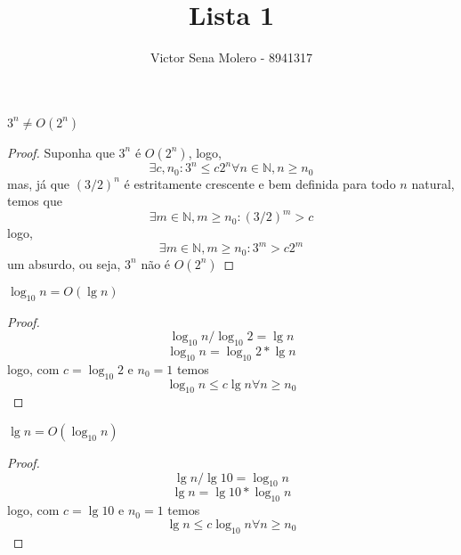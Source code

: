 \documentclass[12pt]{article}
\newcommand{\N}{\mathbb{N}}
\newenvironment{problem}[2][Ex]{\begin{trivlist}
\item[\hskip \labelsep {\bfseries #1}\hskip \labelsep {\bfseries #2.}]}{\end{trivlist}}
\begin{document}
 
 
\title{Lista 1}
\author{Victor Sena Molero - 8941317}
\maketitle
 
\begin{problem}{1.a}
$3^n \neq O(2^n)$
\end{problem}
 
\begin{proof}
Suponha que $3^n$ é $O(2^n)$, logo, \\
$$ \exists c, n_0 : 3^n \leq c2^n \forall n \in \N, n \geq n_0 $$
mas, já que $(3/2)^n$ é estritamente crescente e bem definida para todo $n$ natural, temos que
$$ \exists m \in \N, m \geq n_0 : (3/2)^m > c $$
logo,
$$ \exists m \in \N, m \geq n_0 : 3^m > c2^m $$
um absurdo, ou seja,
$3^n$ não é $O(2^n)$
\end{proof}

\begin{problem}{1.b}
$\log_{10} n = O(\lg n)$
\end{problem}

\begin{proof}
$$ \log_{10} n / \log_{10} 2 = \lg n $$
$$ \log_{10} n = \log_{10} 2 * \lg n $$
logo, com $c = \log_{10} 2$ e $n_0 = 1$ temos
$$ \log_{10} n \leq c\lg{n} \forall n \geq n_0 $$
\end{proof}

\begin{problem}{1.c}
$\lg n = O(\log_{10} n)$
\end{problem}

\begin{proof}
$$ \lg n / \lg 10 = \log_{10} n $$
$$ \lg n = \lg 10 * \log_{10} n $$
logo, com $c = \lg 10$ e $n_0 = 1$ temos
$$ \lg n \leq c \log_{10} n \forall n \geq n_0 $$
\end{proof}
\end{document}
